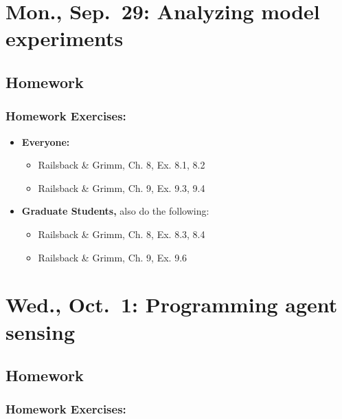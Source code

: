 \documentclass[
]{article}
\providecommand{\tightlist}{%
  \setlength{\itemsep}{0pt}\setlength{\parskip}{0pt}}
\begin{document}
\section{Mon., Sep.~29: Analyzing model
experiments}\label{mon.-sep.-29-analyzing-model-experiments}

\subsection{Homework}\label{homework-7}

\subsubsection{Homework Exercises:}\label{homework-exercises-7}

\begin{itemize}
\item
  \textbf{Everyone:}

  \begin{itemize}
  \tightlist
  \item
    Railsback \& Grimm, Ch. 8, Ex. 8.1, 8.2
  \item
    Railsback \& Grimm, Ch. 9, Ex. 9.3, 9.4
  \end{itemize}
\item
  \textbf{Graduate Students,} also do the following:

  \begin{itemize}
  \tightlist
  \item
    Railsback \& Grimm, Ch. 8, Ex. 8.3, 8.4
  \item
    Railsback \& Grimm, Ch. 9, Ex. 9.6
  \end{itemize}
\end{itemize}

\section{Wed., Oct.~1: Programming agent
sensing}\label{wed.-oct.-1-programming-agent-sensing}

\subsection{Homework}\label{homework-8}

\subsubsection{Homework Exercises:}\label{homework-exercises-8}
\end{document}
